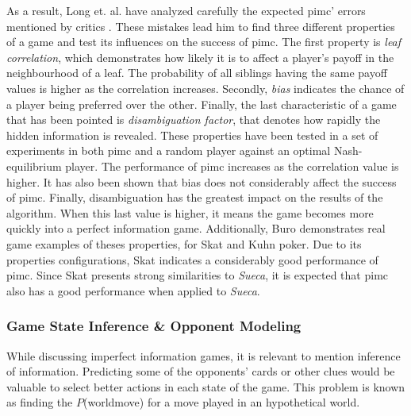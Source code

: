 As a result, Long et. al. have analyzed carefully the expected \gls{pimc}' errors mentioned by critics \cite{Long2010}.
These mistakes lead him to find three different properties of a game and test its influences on the success of \gls{pimc}.
The first property is \emph{leaf correlation}, which demonstrates how likely it is to affect a player's payoff in the neighbourhood of a leaf.
The probability of all siblings having the same payoff values is higher as the correlation increases.
Secondly, \emph{bias} indicates the chance of a player being preferred over the other.
Finally, the last characteristic of a game that has been pointed is \emph{disambiguation factor}, that denotes how rapidly the hidden information is revealed.
These properties have been tested in a set of experiments in both \gls{pimc} and a random player against an optimal Nash-equilibrium player.
The performance of \gls{pimc} increases as the correlation value is higher.
It has also been shown that bias does not considerably affect the success of \gls{pimc}.
Finally, disambiguation has the greatest impact on the results of the algorithm.
When this last value is higher, it means the game becomes more quickly into a perfect information game.
Additionally, Buro demonstrates real game examples of theses properties, for Skat and Kuhn poker.
Due to its properties configurations, Skat indicates a considerably good performance of \gls{pimc}.
Since Skat presents strong similarities to \emph{Sueca}, it is expected that \gls{pimc} also has a good performance when applied to \emph{Sueca}.




\subsubsection{Game State Inference \& Opponent Modeling}


While discussing imperfect information games, it is relevant to mention inference of information.
Predicting some of the opponents' cards or other clues would be valuable to select better actions in each state of the game.
This problem is known as finding the $P$(world\textbar move) for a move played in an hypothetical world.



